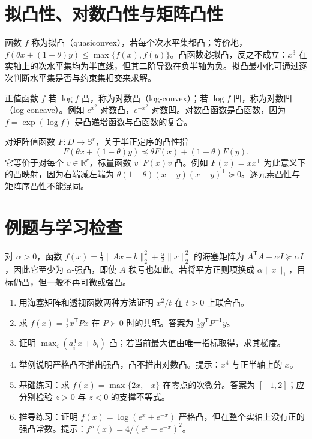 \section{拟凸性、对数凸性与矩阵凸性}

函数 $f$ 称为拟凸（quasiconvex），若每个次水平集都凸；等价地，$f(\theta x+(1-\theta)y)\leq\max\{f(x),f(y)\}$。凸函数必拟凸，反之不成立：$x^3$ 在实轴上的次水平集均为半直线，但其二阶导数在负半轴为负。拟凸最小化可通过逐次判断水平集是否与约束集相交来求解。

正值函数 $f$ 若 $\log f$ 凸，称为对数凸（log-convex）；若 $\log f$ 凹，称为对数凹（log-concave）。例如 $e^{x^2}$ 对数凸，$e^{-x^2}$ 对数凹。对数凸函数是凸函数，因为 $f=\exp(\log f)$ 是凸递增函数与凸函数的复合。

对矩阵值函数 $F:D\to\mathbb S^r$，关于半正定序的凸性指
\[
 F(\theta x+(1-\theta)y)\preceq\theta F(x)+(1-\theta)F(y).
\]
它等价于对每个 $v\in\mathbb R^r$，标量函数 $v^{\mathsf T}F(x)v$ 凸。例如 $F(x)=xx^{\mathsf T}$ 为此意义下的凸映射，因为右端减左端为 $\theta(1-\theta)(x-y)(x-y)^{\mathsf T}\succeq0$。逐元素凸性与矩阵序凸性不能混同。

\section{例题与学习检查}
\begin{example}[曲率与正则化]
对 $\alpha>0$，函数 $f(x)=\tfrac12\|Ax-b\|_2^2+\tfrac\alpha2\|x\|_2^2$ 的海塞矩阵为 $A^{\mathsf T}A+\alpha I\succeq\alpha I$，因此它至少为 $\alpha$-强凸，即使 $A$ 秩亏也如此。若将平方正则项换成 $\alpha\|x\|_1$，目标仍凸，但一般不再可微或强凸。
\end{example}
\begin{enumerate}
 \item 用海塞矩阵和透视函数两种方法证明 $x^2/t$ 在 $t>0$ 上联合凸。
 \item 求 $f(x)=\tfrac12x^{\mathsf T}Px$ 在 $P\succ0$ 时的共轭。答案为 $\tfrac12y^{\mathsf T}P^{-1}y$。
 \item 证明 $\max_i(a_i^{\mathsf T}x+b_i)$ 凸；若当前最大值由唯一指标取得，求其梯度。
 \item 举例说明严格凸不推出强凸，凸不推出对数凸。提示：$x^4$ 与正半轴上的 $x$。
 \item 基础练习：求 $f(x)=\max\{2x,-x\}$ 在零点的次微分。答案为 $[-1,2]$；应分别检验 $z>0$ 与 $z<0$ 的支撑不等式。
 \item 推导练习：证明 $f(x)=\log(e^x+e^{-x})$ 严格凸，但在整个实轴上没有正的强凸常数。提示：$f''(x)=4/(e^x+e^{-x})^2$。
\end{enumerate}

